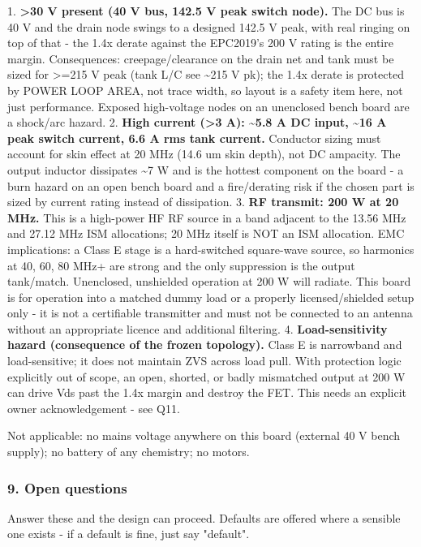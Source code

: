 \documentclass[11pt,a4paper]{article}
\begin{document}
1. \textbf{\textgreater{}30 V present (40 V bus, 142.5 V peak switch node).} The DC bus is 40 V and the drain node swings to a designed 142.5 V peak, with real ringing on top of that - the 1.4x derate against the EPC2019's 200 V rating is the entire margin. Consequences: creepage/clearance on the drain net and tank must be sized for \textgreater{}=215 V peak (tank L/C see \textasciitilde{}215 V pk); the 1.4x derate is protected by POWER LOOP AREA, not trace width, so layout is a safety item here, not just performance. Exposed high-voltage nodes on an unenclosed bench board are a shock/arc hazard. 2. \textbf{High current (\textgreater{}3 A): \textasciitilde{}5.8 A DC input, \textasciitilde{}16 A peak switch current, 6.6 A rms tank current.} Conductor sizing must account for skin effect at 20 MHz (14.6 um skin depth), not DC ampacity. The output inductor dissipates \textasciitilde{}7 W and is the hottest component on the board - a burn hazard on an open bench board and a fire/derating risk if the chosen part is sized by current rating instead of dissipation. 3. \textbf{RF transmit: 200 W at 20 MHz.} This is a high-power HF RF source in a band adjacent to the 13.56 MHz and 27.12 MHz ISM allocations; 20 MHz itself is NOT an ISM allocation. EMC implications: a Class E stage is a hard-switched square-wave source, so harmonics at 40, 60, 80 MHz+ are strong and the only suppression is the output tank/match. Unenclosed, unshielded operation at 200 W will radiate. This board is for operation into a matched dummy load or a properly licensed/shielded setup only - it is not a certifiable transmitter and must not be connected to an antenna without an appropriate licence and additional filtering. 4. \textbf{Load-sensitivity hazard (consequence of the frozen topology).} Class E is narrowband and load-sensitive; it does not maintain ZVS across load pull. With protection logic explicitly out of scope, an open, shorted, or badly mismatched output at 200 W can drive Vds past the 1.4x margin and destroy the FET. This needs an explicit owner acknowledgement - see Q11.

Not applicable: no mains voltage anywhere on this board (external 40 V bench supply); no battery of any chemistry; no motors.

\subsubsection*{9. Open questions}
Answer these and the design can proceed. Defaults are offered where a sensible one exists - if a default is fine, just say "default".
\end{document}
